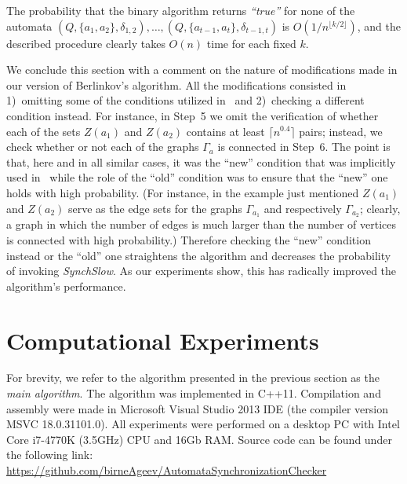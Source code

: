 \documentclass{llncs}
\begin{document}
The probability that the binary algorithm returns \emph{``true''} for none of the automata $(Q,\{a_1,a_2\},\delta_{1,2}),\dots,(Q,\{a_{t-1},a_{t}\},\delta_{t-1,t})$ is $O(1/n^{\lfloor k/2 \rfloor})$, and the described procedure clearly takes $O(n)$ time for each fixed $k$.

We conclude this section with a comment on the nature of modifications made in our version of Berlinkov's algorithm. All the modifications consisted in 1)~omitting some of the conditions utilized in~\cite{Berlinkov:preprint} and 2)~checking a different condition instead. For instance, in Step~5 we omit the verification of whether each of the sets $Z(a_1)$ and $Z(a_2)$ contains at least $\lceil n^{0.4}\rceil$ pairs; instead, we check whether or not each of the graphs $\Gamma_a$ is connected in Step~6. The point is that, here and in all similar cases, it was the ``new'' condition that was implicitly used in~\cite{Berlinkov:preprint} while the role of the ``old'' condition was to ensure that the ``new'' one holds with high probability. (For instance, in the example just mentioned $Z(a_1)$ and $Z(a_2)$ serve as the edge sets for the graphs $\Gamma_{a_1}$ and respectively $\Gamma_{a_2}$; clearly, a graph in which the number of edges is much larger than the number of vertices is connected with high probability.) Therefore checking the ``new'' condition instead or the ``old'' one straightens the algorithm and decreases the probability of invoking \emph{SynchSlow}. As our experiments show, this has radically improved the algorithm's performance.


\section{Computational Experiments}

For brevity, we refer to the algorithm presented in the previous section as the \emph{main algorithm}. The algorithm was implemented in C++11. Compilation and assembly were made in Microsoft Visual Studio 2013 IDE (the compiler version MSVC 18.0.31101.0). All experiments were performed on a desktop PC with Intel Core i7-4770K (3.5GHz) CPU and 16Gb RAM. Source code can be found under the following link:\\ \url{https://github.com/birneAgeev/AutomataSynchronizationChecker}
\end{document}

